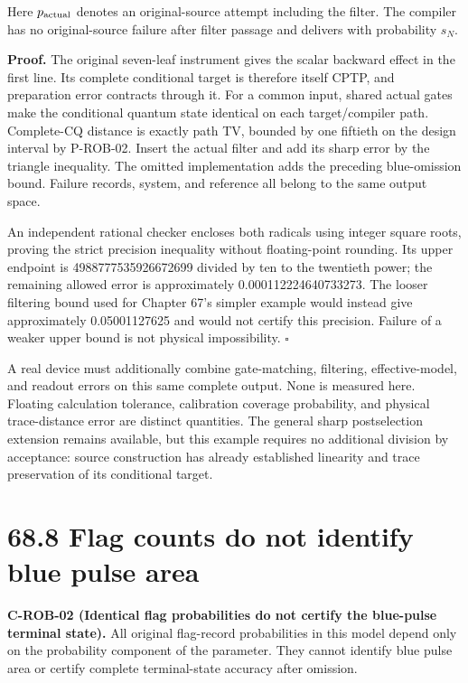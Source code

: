 \documentclass[
  11pt,
  oneside]{book}
\begin{document}
Here \(p_{\rm actual}\) denotes an original-source attempt including the
filter. The compiler has no original-source failure after filter passage
and delivers with probability \(s_N\).

\textbf{Proof.} The original seven-leaf instrument gives the scalar
backward effect in the first line. Its complete conditional target is
therefore itself CPTP, and preparation error contracts through it. For a
common input, shared actual gates make the conditional quantum state
identical on each target/compiler path. Complete-CQ distance is exactly
path TV, bounded by one fiftieth on the design interval by P-ROB-02.
Insert the actual filter and add its sharp error by the triangle
inequality. The omitted implementation adds the preceding blue-omission
bound. Failure records, system, and reference all belong to the same
output space.

An independent rational checker encloses both radicals using integer
square roots, proving the strict precision inequality without
floating-point rounding. Its upper endpoint is 4988777535926672699
divided by ten to the twentieth power; the remaining allowed error is
approximately 0.000112224640733273. The looser filtering bound used for
Chapter 67's simpler example would instead give approximately
0.05001127625 and would not certify this precision. Failure of a weaker
upper bound is not physical impossibility. \(\square\)

A real device must additionally combine gate-matching, filtering,
effective-model, and readout errors on this same complete output. None
is measured here. Floating calculation tolerance, calibration coverage
probability, and physical trace-distance error are distinct quantities.
The general sharp postselection extension remains available, but this
example requires no additional division by acceptance: source
construction has already established linearity and trace preservation of
its conditional target.

\section{68.8 Flag counts do not identify blue pulse area}

\label{c-rob-02}{}

\textbf{C-ROB-02 (Identical flag probabilities do not certify the
blue-pulse terminal state).} All original flag-record probabilities in
this model depend only on the probability component of the parameter.
They cannot identify blue pulse area or certify complete terminal-state
accuracy after omission.
\end{document}

